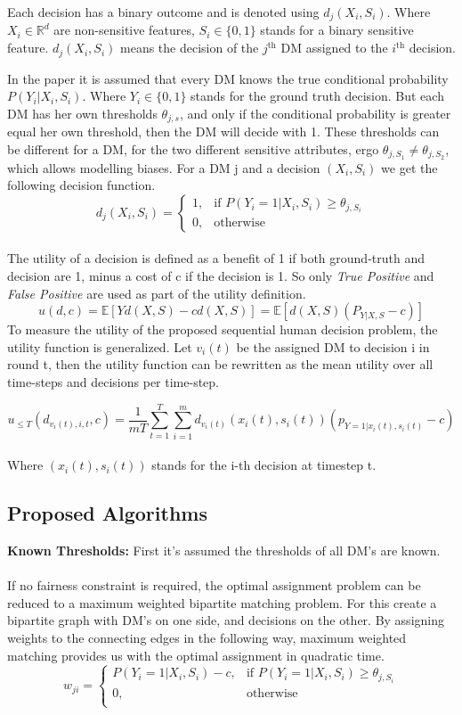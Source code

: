 \documentclass[11pt,a4paper,final]{article}
\begin{document}
Each decision has a binary outcome and is denoted using $d_j(X_i,S_i)$.
Where $X_i \in \mathbb{R}^d$ are non-sensitive features,  $S_i \in \{0,1\}$ stands for a binary sensitive feature. $d_j(X_i,S_i)$ means the decision of the $j^{\text{th}}$ DM assigned to the $i^{\text{th}}$ decision.

In the paper it is assumed that every DM knows the true conditional probability $P(Y_i|X_i,S_i)$. Where $Y_i \in \{0,1\}$ stands for the ground truth decision.
But each DM has her own thresholds $\theta_{j,s}$, and only if the conditional probability is greater equal her own threshold, then the DM will decide with 1.
These thresholds can be different for a DM, for the two different sensitive attributes, ergo $\theta_{j,S_1}\ne \theta_{j,S_2}$, which allows modelling biases. For a DM j and a decision $(X_i,S_i)$ we get the following decision function.
$$
d_j(X_i,S_i) = 
\begin{cases}
1, & {\text{if } P(Y_i=1|X_i,S_i)\ge \theta_{j,S_i}} \\
0, & \text{otherwise}
\end{cases}
$$
\\
The utility of a decision is defined as a benefit of 1 if both ground-truth and decision are 1, minus a cost of c if the decision is 1. So only \emph{True Positive} and \emph{False Positive} are used as part of the utility definition.
$$u(d,c)=\mathbb{E}[Yd(X,S)-cd(X,S)]=\mathbb{E}[d(X,S)(P_{Y|X,S}-c)]$$
To measure the utility of the proposed sequential human decision problem, the utility function is generalized. Let $v_i(t)$ be the assigned DM to decision i in round t, then the utility function can be rewritten as the mean utility over all time-steps and decisions per time-step.

$$u_{\le T}(d_{v_i(t),i,t},c)=\frac{1}{mT}\sum_{t=1}^T \sum_{i=1}^m d_{v_i(t)}(x_i(t),s_i(t))(p_{Y=1|x_i(t),s_i(t)}-c)$$
\\
Where $(x_i(t),s_i(t))$ stands for the i-th decision at timestep t.

\subsection{Proposed Algorithms}
\textbf{Known Thresholds:} First it's assumed the thresholds of all DM's are known. 
\\\\
If no fairness constraint is required, the optimal assignment problem can be reduced to a maximum weighted bipartite matching problem.
For this create a bipartite graph with DM's on one side, and decisions on the other. By assigning weights to the connecting edges in the following way, maximum weighted matching provides us with the optimal assignment in quadratic time.
$$
w_{ji} = 
\begin{cases}
P(Y_i=1|X_i,S_i)-c, & \text{if } P(Y_i=1|X_i,S_i)\ge \theta_{j,S_i} \\
0, & \text{otherwise} \\
\end{cases}
$$ 
\end{document}
